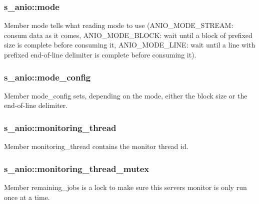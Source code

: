 \subsubsection[{mode}]{\setlength{\rightskip}{0pt plus 5cm}s\+\_\+anio\+::mode}\label{structs__anio_a8103ffbbc1a816b3461f8b0c26c9c3ff}
Member \textquotesingle{}mode\textquotesingle{} tells what reading mode to use (A\+N\+I\+O\+\_\+\+M\+O\+D\+E\+\_\+\+S\+T\+R\+E\+A\+M\+: consum data as it comes, A\+N\+I\+O\+\_\+\+M\+O\+D\+E\+\_\+\+B\+L\+O\+C\+K\+: wait until a block of prefixed size is complete before consuming it, A\+N\+I\+O\+\_\+\+M\+O\+D\+E\+\_\+\+L\+I\+N\+E\+: wait until a line with prefixed end-\/of-\/line delimiter is complete before consuming it). \hypertarget{structs__anio_ab8b074796a020765a00a9dd9b0c4d709}{}
\subsubsection[{mode\+\_\+config}]{\setlength{\rightskip}{0pt plus 5cm}s\+\_\+anio\+::mode\+\_\+config}\label{structs__anio_ab8b074796a020765a00a9dd9b0c4d709}
Member \textquotesingle{}mode\+\_\+config\textquotesingle{} sets, depending on the mode, either the block size or the end-\/of-\/line delimiter. \hypertarget{structs__anio_ad87ae1e913300a5f18105cc5e9bcd991}{}
\subsubsection[{monitoring\+\_\+thread}]{\setlength{\rightskip}{0pt plus 5cm}s\+\_\+anio\+::monitoring\+\_\+thread}\label{structs__anio_ad87ae1e913300a5f18105cc5e9bcd991}
Member \textquotesingle{}monitoring\+\_\+thread\textquotesingle{} contains the monitor thread id. \hypertarget{structs__anio_a5e6f96badcda7b3194416a2234a0473f}{}
\subsubsection[{monitoring\+\_\+thread\+\_\+mutex}]{\setlength{\rightskip}{0pt plus 5cm}s\+\_\+anio\+::monitoring\+\_\+thread\+\_\+mutex}\label{structs__anio_a5e6f96badcda7b3194416a2234a0473f}
Member \textquotesingle{}remaining\+\_\+jobs\textquotesingle{} is a lock to make sure this server\textquotesingle{}s monitor is only run once at a time. \hypertarget{structs__anio_a2090eced07a64cca0f4a39e0e3928214}{}
